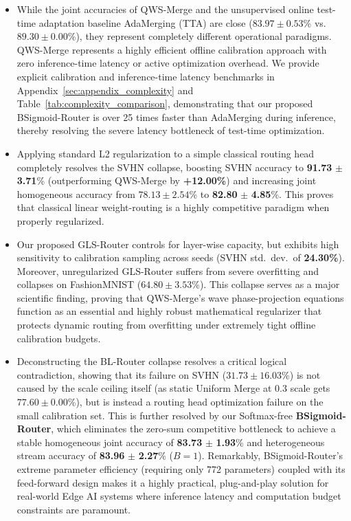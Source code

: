 \begin{itemize}
    \item While the joint accuracies of QWS-Merge and the unsupervised online test-time adaptation baseline AdaMerging (TTA) are close ($83.97 \pm 0.53$\% vs.\ $89.30 \pm 0.00$\%), they represent completely different operational paradigms. QWS-Merge represents a highly efficient offline calibration approach with zero inference-time latency or active optimization overhead. We provide explicit calibration and inference-time latency benchmarks in Appendix~\ref{sec:appendix_complexity} and Table~\ref{tab:complexity_comparison}, demonstrating that our proposed BSigmoid-Router is over 25 times faster than AdaMerging during inference, thereby resolving the severe latency bottleneck of test-time optimization.
    \item Applying standard L2 regularization to a simple classical routing head completely resolves the SVHN collapse, boosting SVHN accuracy to \textbf{91.73} $\pm$ \textbf{3.71}\% (outperforming QWS-Merge by \textbf{+12.00\%}) and increasing joint homogeneous accuracy from $78.13 \pm 2.54$\% to \textbf{82.80} $\pm$ \textbf{4.85}\%. This proves that classical linear weight-routing is a highly competitive paradigm when properly regularized.
    \item Our proposed GLS-Router controls for layer-wise capacity, but exhibits high sensitivity to calibration sampling across seeds (SVHN std.\ dev.\ of \textbf{24.30\%}). Moreover, unregularized GLS-Router suffers from severe overfitting and collapses on FashionMNIST ($64.80 \pm 3.53$\%). This collapse serves as a major scientific finding, proving that QWS-Merge's wave phase-projection equations function as an essential and highly robust mathematical regularizer that protects dynamic routing from overfitting under extremely tight offline calibration budgets.
    \item Deconstructing the BL-Router collapse resolves a critical logical contradiction, showing that its failure on SVHN ($31.73 \pm 16.03$\%) is not caused by the scale ceiling itself (as static Uniform Merge at $0.3$ scale gets $77.60 \pm 0.00$\%), but is instead a routing head optimization failure on the small calibration set. This is further resolved by our Softmax-free \textbf{BSigmoid-Router}, which eliminates the zero-sum competitive bottleneck to achieve a stable homogeneous joint accuracy of \textbf{83.73} $\pm$ \textbf{1.93}\% and heterogeneous stream accuracy of \textbf{83.96} $\pm$ \textbf{2.27}\% ($B=1$). Remarkably, BSigmoid-Router's extreme parameter efficiency (requiring only 772 parameters) coupled with its feed-forward design makes it a highly practical, plug-and-play solution for real-world Edge AI systems where inference latency and computation budget constraints are paramount.
\end{itemize}

